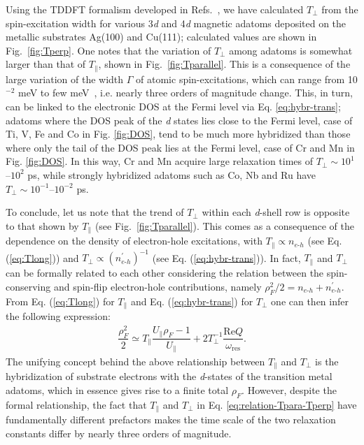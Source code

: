\documentclass[prb,footinbib,showpacs,twocolumn,amsmath,amssymb]{revtex4}
\newcommand{\bek}{\begin{eqnarray}}
\newcommand{\ek}{\end{eqnarray}}
\begin{document}
Using the TDDFT formalism 
developed in Refs.~, we 
have calculated $T_{\perp}$ from the spin-excitation width
for various 3\textit{d} and 4\textit{d} magnetic adatoms deposited on the metallic substrates
Ag(100) and Cu(111); calculated values are shown in Fig.~\ref{fig:Tperp}. 
One notes that the variation of $T_{\perp}$ among adatoms is somewhat larger than that of 
$T_{\parallel}$, shown in Fig.~\ref{fig:Tparallel}. 
This is a consequence of the large variation of the width $\Gamma$ 
of atomic spin-excitations, which can range from 10$^{-2}$ meV to 
few meV~\cite{dias_relativistic_2015,ibanez-azpiroz_zero-point_2016},
i.e. nearly three orders of magnitude change.
This, in turn, can be linked to the electronic  DOS at the Fermi level via Eq. \ref{eq:hybr-trans};
adatoms where the DOS peak of the \textit{d} states lies close to the Fermi level, case of  
Ti, V, Fe and Co in Fig. \ref{fig:DOS}, tend to be much more hybridized than those 
where only the tail of the DOS peak lies at the Fermi level, case of Cr and Mn in Fig. \ref{fig:DOS}.
In this way, Cr and Mn acquire large relaxation times of  $T_{\perp}\sim 10^{1}$--$10^{2}$ ps,
while strongly hybridized adatoms such as Co, 
Nb and Ru
have $T_{\perp}\sim 10^{-1}$--$10^{-2}$ ps.


To conclude, let us note that the trend of $T_{\perp}$
within each \textit{d}-shell row is opposite to that shown by $T_{\parallel}$ (see Fig.~\ref{fig:Tparallel}).
This comes as a consequence of the dependence on the density of electron-hole excitations,
with $T_{\parallel}\propto n_{e\text{-}h}$ (see Eq. (\ref{eq:Tlong}))
and $T_{\perp}\propto (n_{e\text{-}h}^{\prime})^{-1}$ (see Eq. (\ref{eq:hybr-trans})).
In fact, $T_{\parallel}$ and $T_{\perp}$
can be formally related to each other considering the relation between
the spin-conserving and spin-flip electron-hole contributions, namely
$\rho_{F}^{2}/2=n_{e\text{-}h}+n_{e\text{-}h}^{\prime}$. 
From Eq. (\ref{eq:Tlong}) for $T_{\parallel}$ 
and Eq. (\ref{eq:hybr-trans}) for $T_{\perp}$ one can then infer
the following expression:
\bek\label{eq:relation-Tpara-Tperp}
\dfrac{\rho_{F}^{2}}{2}\simeq
T_{\parallel}\dfrac{U_{\parallel}\rho_{F}-1}{U_{\parallel}}
+2T_{\perp}^{-1}\dfrac{\text{Re}Q}{\omega_{\text{res}}}.
\ek
The unifying concept behind the above relationship between $T_{\parallel}$ and $T_{\perp}$
is the hybridization of substrate electrons with the \textit{d}-states of the transition metal 
adatoms, which in essence gives rise to a finite total $\rho_{F}$. 
However, despite the formal relationship,
the fact that 
$T_{\parallel}$ and $T_{\perp}$ in Eq. \ref{eq:relation-Tpara-Tperp}
have fundamentally different prefactors
makes the time scale of the two relaxation constants
differ by nearly three orders of magnitude.
\end{document}
